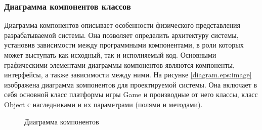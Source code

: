 \subsubsection{Диаграмма компонентов классов}
Диаграмма компонентов описывает особенности физического представления разрабатываемой системы. Она позволяет определить архитектуру системы, установив зависимости между программными компонентами, в роли которых может выступать как исходный, так и исполняемый код. Основными графическими элементами диаграммы компонентов являются компоненты, интерфейсы, а также зависимости между ними. На рисунке \ref{diagram.eps:image} изображена диаграмма компонентов для проектируемой системы. Она включает в себя основной класс платформы игры Game и производные от него классы, класс Object с наследниками и их параметрами (полями и методами).
\begin{figure}[ht]
	\caption{Диаграмма компонентов}
	\label{diagram:image}
\end{figure}
